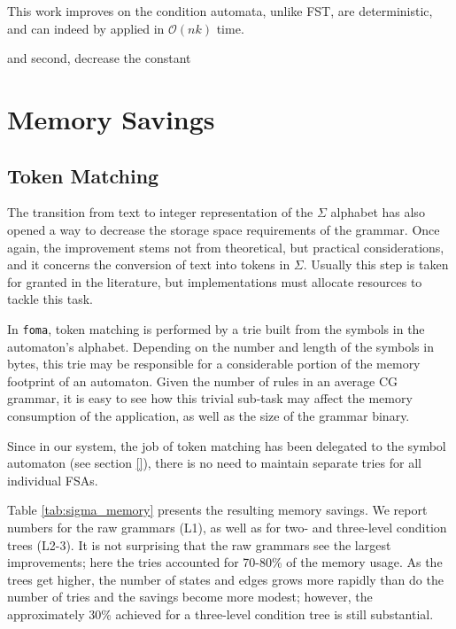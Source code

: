 \documentclass{article}
\begin{document}
This work improves on 
the condition automata, unlike FST, are deterministic, and can indeed by applied
in $\mathcal{O}(nk)$ time.


and second, decrease the constant 

\section{Memory Savings}
\label{sec:memory}


\subsection{Token Matching}
\label{sec:sub_token}

The transition from text to integer representation of the $\Sigma$ alphabet
has also opened a way to decrease the storage space requirements of the grammar.
Once again, the improvement stems not from theoretical, but practical
considerations, and it concerns the conversion of text into tokens in $\Sigma$.
Usually this step is taken for granted in the literature, but implementations
must allocate resources to tackle this task.  %

In \texttt{foma}, token matching is performed by a trie built from the symbols
in the automaton's alphabet. Depending on the number and length of the symbols
in bytes, this trie may be responsible for a considerable portion of the memory
footprint of an automaton. Given the number of rules in an average CG grammar,
it is easy to see how this trivial sub-task may affect the memory consumption of
the application, as well as the size of the grammar binary.

Since in our system, the job of token matching has been delegated to the symbol
automaton (see section \ref{}), there is no need to maintain separate tries for
all individual FSAs. 

Table \ref{tab:sigma_memory} presents the resulting memory savings.
We report numbers for the raw grammars (L1), as well as for two- and three-level
condition trees (L2-3). It is not surprising that the raw grammars see the
largest improvements; here the tries accounted for 70-80\% of the memory
usage. As the trees get higher, the number of states and edges grows more
rapidly than do the number of tries and the savings become more modest; however,
the approximately 30\% achieved for a three-level condition tree is still
substantial.  %
\end{document}
